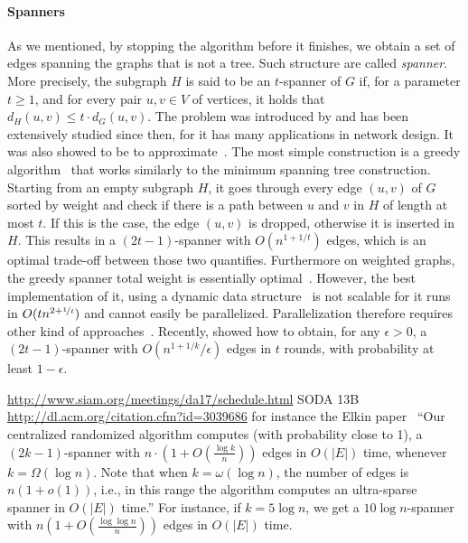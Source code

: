 \paragraph{Spanners}
\label{par:spanners}

As we mentioned, by stopping the \gtx{} algorithm before it finishes, we obtain a set of edges
spanning the graphs that is not a tree. Such structure are called \emph{spanner}. More precisely,
the subgraph $H$ is said to be an $t$-spanner of $G$ if, for a parameter $t \geq 1$, and for every
pair $u, v \in V$ of vertices, it holds that $d_H(u, v) \leq t \cdot d_G(u, v)$. The problem was
introduced by \textcites{SpannerFirst89}{SpannerSecond89} and has been extensively studied since
then, for it has many applications in network design. It was also showed to be \NPh{} to
approximate~\autocite{SpannerNPHard07}. The most simple construction is a greedy
algorithm~\autocite{greedySpanner93} that works similarly to the minimum spanning tree construction.
Starting from an empty subgraph $H$, it goes through every edge $(u, v)$ of $G$ sorted by weight and
check if there is a path between $u$ and $v$ in $H$ of length at most $t$. If this is the case, the edge
$(u,v)$ is dropped, otherwise it is inserted in $H$. This results in a $(2t - 1)$-spanner with
$O(n^{1+1/t})$ edges, which is an optimal trade-off between those two quantifies.  Furthermore on
weighted graphs, the greedy spanner total weight is essentially optimal~\autocite{GreedyOpt16}.
However, the best implementation of it, using a dynamic data structure~\autocite{fastGreedy04} is
not scalable for it runs in $O(t n^{2+\nicefrac{1}{t}})$ and cannot easily be parallelized.
Parallelization therefore requires other kind of approaches~\autocites{parSpanner08}{parSpanner15}.
Recently, \textcite{Spanner17} showed how to obtain, for any $\epsilon > 0$, a $(2t - 1)$-spanner
with $O(n^{1+1/k}/\epsilon)$ edges in $t$ rounds, with probability at least $1 - \epsilon$.

\iffalse
\url{http://www.siam.org/meetings/da17/schedule.html} SODA 13B \url{http://dl.acm.org/citation.cfm?id=3039686}
for instance the Elkin paper~\autocite{Spanner17} \enquote{Our centralized randomized algorithm computes (with
probability close to 1), a $(2k - 1)$-spanner with $n \cdot (1 + O(\frac{\log k}{n}))$ edges in
$O(|E|)$ time, whenever $k = \Omega(\log n)$. Note that when $k = \omega(\log n)$, the number of
edges is $n(1+o(1))$, i.e., in this range the algorithm computes an ultra-sparse spanner in $O(|E|)$
time.} For instance, if $k=5\log n$, we get a $10\log n$-spanner with $n\left(1+O\left(\frac{\log\log
n}{n}\right)\right)$ edges in $O(|E|)$ time.


